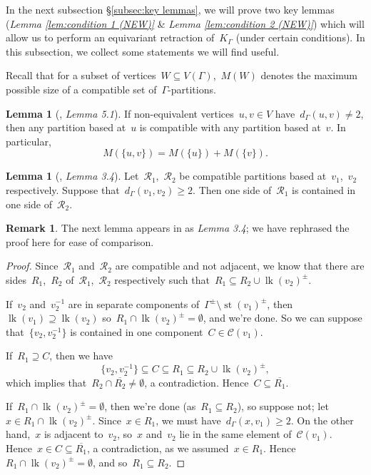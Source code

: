 \documentclass[11pt]{amsart}
\theoremstyle{definition}
\theoremstyle{definition}
\theoremstyle{definition}
\theoremstyle{definition}
\newtheorem{lemma}[theorem]{Lemma}
\newtheorem{remark}[theorem]{Remark}
\newcommand{\calC}{\mathcal{C}}
\newcommand{\calR}{\mathcal{R}} %
\newcommand{\link}[1]{\operatorname{lk}({#1})} %
\newcommand{\str}[1]{\operatorname{st}({#1})} %
\newcommand{\spine}{K_{\Gamma}} %
\begin{document}
In the next subsection \S\ref{subsec:key lemmas}, we will prove two key lemmas (\emph{Lemma \ref{lem:condition 1 (NEW)}} \& \emph{Lemma \ref{lem:condition 2 (NEW)}}) which will allow us to perform an equivariant retraction of~$\spine$ (under certain conditions). In this subsection, we collect some statements we will find useful.

Recall that for a subset of vertices~$W \subseteq V(\Gamma)$,~$M(W)$ denotes the maximum possible size of a compatible set of~$\Gamma$-partitions. 

\begin{lemma}[\cite{MillardVogtmannCubeComplexes21}, \textit{Lemma 5.1}]\label{lem:MV19, 5.1}
    If non-equivalent vertices~$u, v \in V$ have~$d_\Gamma(u, v) \neq 2$, then any partition based at~$u$ is compatible with any partition based at~$v$. In particular, \[M(\{u, v\}) = M(\{u\}) + M(\{v\}).\]
\end{lemma}

\begin{lemma}[\cite{CharneyStambaughVogtmannUntwistedOuterSpace17}, \textit{Lemma 3.4}]\label{lem:distance >= 2 implies containment of sides}
    Let~$\calR_1$,~$\calR_2$ be compatible partitions based at~$v_1$,~$v_2$ respectively. Suppose that~$d_\Gamma(v_1, v_2) \geq 2$. Then one side of~$\calR_1$ is contained in one side of~$\calR_2$. 
\end{lemma}

\begin{remark}\label{rem:proof of CSV17, 3.4}
    The next lemma appears in \cite{CharneyStambaughVogtmannUntwistedOuterSpace17} as \emph{Lemma 3.4}; we have rephrased the proof here for ease of comparison.
\end{remark}

\begin{proof}
    Since~$\calR_1$ and~$\calR_2$ are compatible and not adjacent, we know that there are sides~$R_1$,~$R_2$ of~$\calR_1$,~$\calR_2$ respectively such that~$R_1 \subseteq R_2 \cup \link{v_2}^\pm$.

    If~$v_2$ and~$v_2^{-1}$ are in separate components of~$\Gamma^\pm \setminus \str{v_1}^\pm$, then ~$\link{v_1} \supseteq \link{v_2}$ so~$R_1 \cap \link{v_2}^\pm = \emptyset$, and we're done. So we can suppose that~$\{v_2, v_2^{-1}\}$ is contained in one component~$C \in \calC(v_1)$.

    If~$R_1 \supseteq C$, then we have \[\{v_2, v_2^{-1}\} \subseteq C \subseteq R_1 \subseteq R_2 \cup \link{v_2}^\pm,\] which implies that~$R_2 \cap \overline{R_2} \neq \emptyset$, a contradiction. Hence~$C \subseteq \overline{R_1}$.

    If~$R_1 \cap \link{v_2}^\pm = \emptyset$, then we're done (as~$R_1 \subseteq R_2$), so suppose not; let~$x \in R_1 \cap \link{v_2}^\pm$. Since~$x \in R_1$, we must have~$d_\Gamma(x, v_1) \geq 2$. On the other hand,~$x$ is adjacent to~$v_2$, so~$x$ and~$v_2$ lie in the same element of~$\calC(v_1)$. Hence~$x \in C \subseteq \overline{R_1}$, a contradiction, as we assumed~$x \in R_1$. Hence~$R_1 \cap \link{v_2}^\pm = \emptyset$, and so~$R_1 \subseteq R_2$.
\end{proof}
\end{document}
